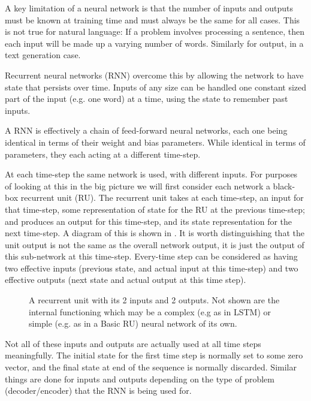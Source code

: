 \documentclass[12pt,parskip]{komatufte}
\begin{document}
A key limitation of a neural network is that the number of inputs and outputs must be known at training time and must always be the same for all cases.
This is not true for natural language: If a problem involves processing a sentence, then each input will be made up a varying number of words. Similarly for output, in a text generation case.



Recurrent neural networks (RNN) overcome this by allowing the network to have state that persists over time.
Inputs of any size can be handled one constant sized part of the input (e.g. one word) at a time, using the state to remember past inputs.


A RNN is effectively a chain of feed-forward neural networks,
each one being identical in terms of their weight and bias parameters.
While identical in terms of parameters, they each acting at a different time-step.



At each time-step the same network is used, with different inputs.
For purposes of looking at this in the big picture we will first consider each network a black-box recurrent unit (RU).
The recurrent unit takes at each time-step, an input for that time-step, some representation  of state for the RU at the previous time-step; and produces an output for this time-step, and its state representation for the next time-step.
A diagram of this is shown in .
It is worth distinguishing that the unit output is not the same as the overall network output, it is just the output of this sub-network at this time-step.
Every-time step can be considered as having two effective inputs (previous state, and actual input at this time-step) and two effective outputs (next state and actual output at this time step).

\begin{figure}
	\caption{A recurrent unit with its 2 inputs and 2 outputs. Not shown are the internal functioning which may be a complex (e.g as in LSTM) or simple (e.g. as in a Basic RU) neural network of its own.}
	\label{fig-ru}
	\centering
		
			
\end{figure}

Not all of these inputs and outputs are actually used at all time steps meaningfully.
The initial state for the first time step is normally set to some zero vector,
and the final state at end of the sequence is normally discarded.
Similar things are done for inputs and outputs depending on the type of problem (decoder/encoder) that the RNN is being used for.
\end{document}
